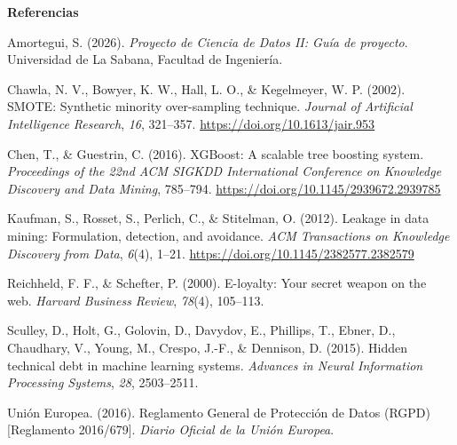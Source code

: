 \documentclass[12pt,a4paper]{article}
\begin{document}
\newpage


\begin{center}
{\bfseries Referencias}
\end{center}

\setlength{\parindent}{0cm}
\setlength{\hangindent}{1.27cm}

Amortegui, S. (2026). \textit{Proyecto de Ciencia de Datos II: Guía de proyecto}. Universidad de La Sabana, Facultad de Ingeniería.

\vspace{0.3em}

Chawla, N. V., Bowyer, K. W., Hall, L. O., \& Kegelmeyer, W. P. (2002). SMOTE: Synthetic minority over-sampling technique. \textit{Journal of Artificial Intelligence Research}, \textit{16}, 321--357. \url{https://doi.org/10.1613/jair.953}

\vspace{0.3em}

Chen, T., \& Guestrin, C. (2016). XGBoost: A scalable tree boosting system. \textit{Proceedings of the 22nd ACM SIGKDD International Conference on Knowledge Discovery and Data Mining}, 785--794. \url{https://doi.org/10.1145/2939672.2939785}

\vspace{0.3em}

Kaufman, S., Rosset, S., Perlich, C., \& Stitelman, O. (2012). Leakage in data mining: Formulation, detection, and avoidance. \textit{ACM Transactions on Knowledge Discovery from Data}, \textit{6}(4), 1--21. \url{https://doi.org/10.1145/2382577.2382579}

\vspace{0.3em}

Reichheld, F. F., \& Schefter, P. (2000). E-loyalty: Your secret weapon on the web. \textit{Harvard Business Review}, \textit{78}(4), 105--113.

\vspace{0.3em}

Sculley, D., Holt, G., Golovin, D., Davydov, E., Phillips, T., Ebner, D., Chaudhary, V., Young, M., Crespo, J.-F., \& Dennison, D. (2015). Hidden technical debt in machine learning systems. \textit{Advances in Neural Information Processing Systems}, \textit{28}, 2503--2511.

\vspace{0.3em}

Unión Europea. (2016). Reglamento General de Protección de Datos (RGPD) [Reglamento 2016/679]. \textit{Diario Oficial de la Unión Europea}.
\end{document}
